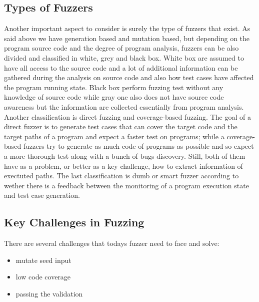 \subsection{Types of Fuzzers}
Another important aspect to consider is surely the type of fuzzers that exist. As said above we have generation based and mutation based, but depending on the program source code and the degree of program 
analysis, fuzzers can be also divided and classified in white, grey and black box.
White box are assumed to have all access to the source code and a lot of additional information can be gathered during the analysis on source code and also how test cases have affected the program running state. 
Black box perform fuzzing test without any knowledge of source code while gray one also does not have source code awareness but the information are collected essentially from program analysis.
Another classification is direct fuzzing and coverage-based fuzzing. The goal of a direct fuzzer is to generate test cases that can cover the target code and the target paths of a program and expect a faster test on programs; while a coverage-based fuzzers
try to generate as much code of programs as possible and so expect a more thorough test along with a bunch of bugs discovery. Still, both of them have as a problem, or better as a key challenge, how to extract information of exectuted paths.
The last classification is dumb or smart fuzzer according to wether there is a feedback between the monitoring of a program execution state and test case generation. 

\subsection{Key Challenges in Fuzzing}
There are several challenges that todays fuzzer need to face and solve:
\begin{itemize}
\item mutate seed input
\item low code coverage
\item passing the validation
\end{itemize}

